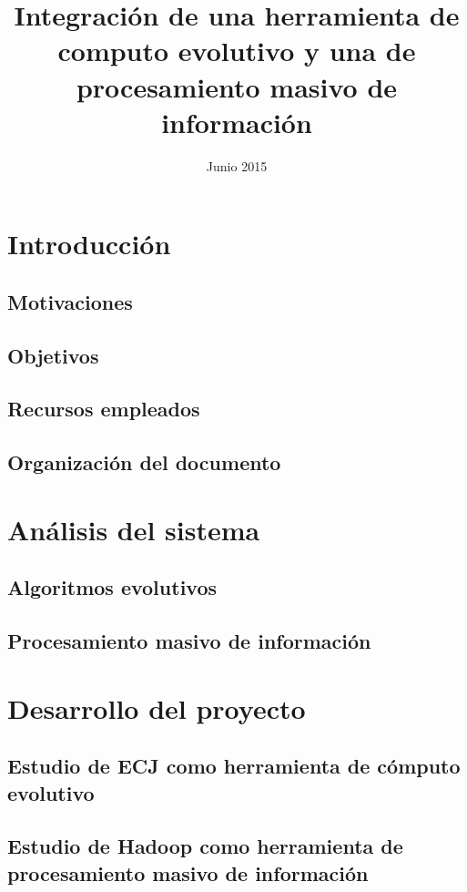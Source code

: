 \documentclass{estilos-y-libreria}
\title{Integración de una herramienta de computo evolutivo y una de procesamiento masivo de informaci\'on}
\date{Junio 2015}
\begin{document}
\frontmatter
\hacerportada
\hacercontraportada
\newpage{\ }
\thispagestyle{empty} 
\hacerprologo
\haceragradecimientos
\setcounter{secnumdepth}{2}
\setcounter{tocdepth}{2}
\tableofcontents
\listoffigures
\listoftables

\mainmatter

\chapter{Introducci\'on}
	\section{Motivaciones\label{motivaciones}}
		
	\section{Objetivos}
	\section{Recursos empleados}
	\section{Organizaci\'on del documento}

\chapter{An\'alisis del sistema}
	
	\section{Algoritmos evolutivos}
		
	\section{Procesamiento masivo de informaci\'on}
		

\chapter{Desarrollo del proyecto}
	
	\section{Estudio de ECJ como herramienta de c\'omputo evolutivo\label{desarrollo-ecj}}
		
	\section{Estudio de Hadoop como herramienta de procesamiento masivo de informaci\'on\label{desarrollo-hadoop}}
		
\end{document}
